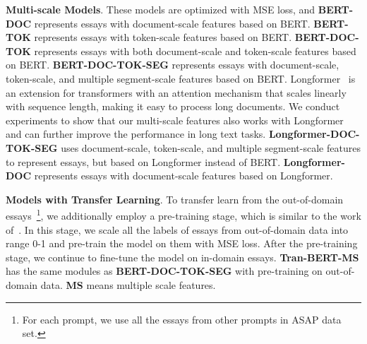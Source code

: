 \documentclass[11pt]{article}
\begin{document}
\textbf{Multi-scale Models}. These models are optimized with MSE loss, and 
\textbf{BERT-DOC} represents essays with document-scale features based on BERT.
\textbf{BERT-TOK} represents essays with token-scale features based on BERT.
\textbf{BERT-DOC-TOK} represents essays with both document-scale and token-scale features based on BERT.
\textbf{BERT-DOC-TOK-SEG} represents essays with document-scale, token-scale, and multiple segment-scale features based on BERT.
Longformer~\citep{Beltagy2020} is an extension for transformers with an attention mechanism that scales linearly with sequence length, making it easy to process long documents.
We conduct experiments to show that our multi-scale features also works with Longformer and can further improve the performance in long text tasks.
\textbf{Longformer-DOC-TOK-SEG} uses document-scale, token-scale, and multiple segment-scale features to represent essays, but based on Longformer instead of BERT.
\textbf{Longformer-DOC} represents essays with document-scale features based on Longformer. 

\textbf{Models with Transfer Learning}.
To transfer learn from the out-of-domain essays~\footnote{For each prompt, we use all the essays from other prompts in ASAP data set.}, we additionally employ a pre-training stage, which is similar to the work of~\citep{Song:2020}.
In this stage, we scale all the labels of essays from out-of-domain data into range 0-1 and pre-train the model on them with MSE loss.
After the pre-training stage, we continue to fine-tune the model on in-domain essays.
\textbf{Tran-BERT-MS} has the same modules as \textbf{BERT-DOC-TOK-SEG} with pre-training on out-of-domain data.
\textbf{MS} means multiple scale features.
\end{document}
